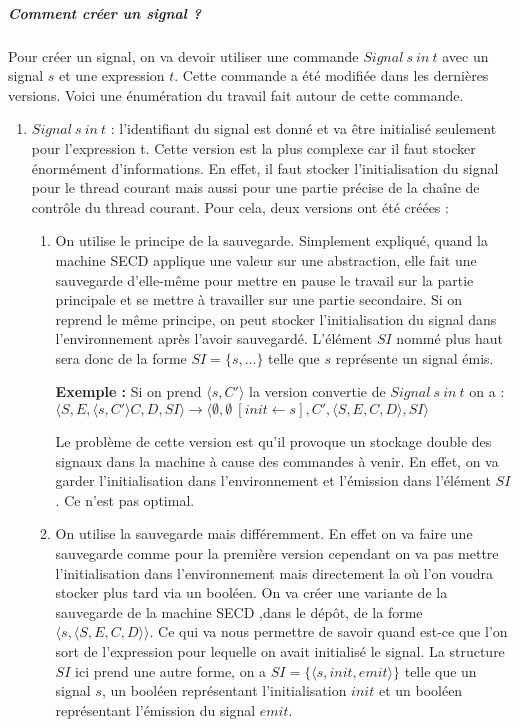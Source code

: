 \documentclass[10pt,a4paper]{report}
\begin{document}
\subparagraph{Comment créer un signal ?}
Pour créer un signal, on va devoir utiliser une commande $Signal~s~in~t$ avec un signal $s$ et une expression $t$. Cette commande a été modifiée dans les dernières versions. Voici une énumération du travail fait autour de cette commande.
\smallbreak
\begin{enumerate}
\item $Signal~s~in~t$ : l'identifiant du signal est donné et va être initialisé seulement pour l'expression t. Cette version est la plus complexe car il faut stocker énormément d'informations. En effet, il faut stocker l'initialisation du signal pour le thread courant mais aussi pour une partie précise de la chaîne de contrôle du thread courant. Pour cela, deux versions ont été créées :
  \begin{enumerate}
  \item On utilise le principe de la sauvegarde. Simplement expliqué, quand la machine SECD applique une valeur sur une abstraction, elle fait une sauvegarde d'elle-même pour mettre en pause le travail sur la partie principale et se mettre à travailler sur une partie secondaire. Si on reprend le même principe, on peut stocker l'initialisation du signal dans l'environnement après l'avoir sauvegardé. L'élément $SI$ nommé plus haut sera donc de la forme $SI=\{s,...\}$ telle que $s$ représente un signal émis.
    \medbreak
    
    \textbf{Exemple :} Si on prend $\langle s,C'\rangle$ la version convertie de $Signal~s~in~t$ on a : 
    \\$\langle S,E,\langle s,C'\rangle C,D,SI\rangle \longrightarrow \langle \emptyset,\emptyset~[init \leftarrow s],C',\langle S,E,C,D\rangle,SI\rangle$  
    \medbreak
    
    Le problème de cette version est qu'il provoque un stockage double des signaux dans la machine à cause des commandes à venir. En effet, on va garder l'initialisation dans l'environnement et l'émission dans l'élément $SI$. Ce n'est pas optimal.
    
  \item On utilise la sauvegarde mais différemment. En effet on va faire une sauvegarde comme pour la première version cependant on va pas mettre l'initialisation dans l'environnement mais directement la où l'on voudra stocker plus tard via un booléen. On va créer une variante de la sauvegarde de la machine SECD ,dans le dépôt, de la forme $\langle s,\langle S,E,C,D\rangle\rangle$. Ce qui va nous permettre de savoir quand est-ce que l'on sort de l'expression pour lequelle on avait initialisé le signal. La structure $SI$ ici prend une autre forme, on a $SI=\{\langle s,init,emit\rangle\}$ telle que un signal $s$, un booléen représentant l'initialisation $init$  et un booléen représentant l'émission du signal $emit$.
    \medbreak
    

\end{enumerate}
\end{enumerate}
\end{document}
